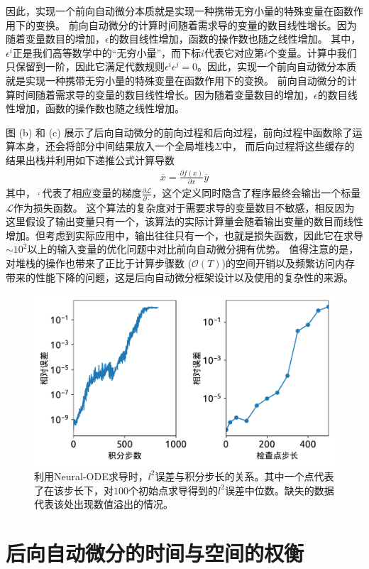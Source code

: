 \documentclass[A4,twoside,fontset=ubuntu,UTF8]{ctexart}
\begin{document}
因此，实现一个前向自动微分本质就是实现一种携带无穷小量的特殊变量在函数作用下的变换。
前向自动微分的计算时间随着需求导的变量的数目线性增长。因为随着变量数目的增加，$\epsilon$的数目线性增加，函数的操作数也随之线性增加。
其中，$\epsilon^i$正是我们高等数学中的“无穷小量”，而下标$i$代表它对应第$i$个变量。计算中我们只保留到一阶，因此它满足代数规则$\epsilon^i\epsilon^j = 0$。因此，实现一个前向自动微分本质就是实现一种携带无穷小量的特殊变量在函数作用下的变换。
前向自动微分的计算时间随着需求导的变量的数目线性增长。因为随着变量数目的增加，$\epsilon$的数目线性增加，函数的操作数也随之线性增加。

图 (b) 和 (c) 展示了后向自动微分的前向过程和后向过程，前向过程中函数除了运算本身，还会将部分中间结果放入一个全局堆栈$\Sigma$中，
而后向过程将这些缓存的结果出栈并利用如下递推公式计算导数
\begin{align}
    \overline{x} = \frac{\partial f(x)}{\partial x}\overline{y}
\end{align}
其中，$\overline{\cdot}$代表了相应变量的梯度$\frac{\partial \mathcal{L}}{\partial \cdot}$，这个定义同时隐含了程序最终会输出一个标量$\mathcal{L}$作为损失函数。
这个算法的复杂度对于需要求导的变量数目不敏感，相反因为这里假设了输出变量只有一个，该算法的实际计算量会随着输出变量的数目而线性增加。但考虑到实际应用中，输出往往只有一个，也就是损失函数，因此它在求导$\sim 10^2$以上的输入变量的优化问题中对比前向自动微分拥有优势。
值得注意的是，对堆栈的操作也带来了正比于计算步骤数 ($\mathcal{O}(T)$)的空间开销以及频繁访问内存带来的性能下降的问题，这是后向自动微分框架设计以及使用的复杂性的来源。

\begin{figure}[t]
\centering
\includegraphics[width=0.6\columnwidth]{./fig2.pdf}
    \caption{利用Neural-ODE求导时，$l^2$误差与积分步长的关系。其中一个点代表了在该步长下，对$100$个初始点求导得到的$l^2$误差中位数。缺失的数据代表该处出现数值溢出的情况。\label{fig:neuralode-error}} 
\end{figure}


\section{后向自动微分的时间与空间的权衡}\label{sec:timespace}
\end{document}
